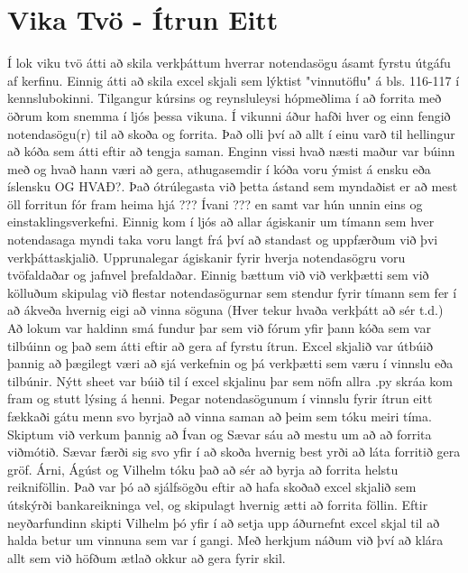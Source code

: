 \documentclass[a4paper, 12 pt]{article}
\begin{document}
\section{Vika Tvö - Ítrun Eitt}
Í lok viku tvö átti að skila verkþáttum hverrar notendasögu ásamt fyrstu útgáfu af kerfinu.  Einnig átti að skila excel skjali sem lýktist "vinnutöflu" á bls. 116-117 í kennslubokinni.  Tilgangur kúrsins og reynsluleysi hópmeðlima í að forrita með öðrum kom snemma í ljós þessa vikuna.  Í vikunni áður hafði hver og einn fengið notendasögu(r) til að skoða og forrita.  Það olli því að allt í einu varð til hellingur að kóða sem átti eftir að tengja saman.  Enginn vissi hvað næsti maður var búinn með og hvað hann væri að gera, athugasemdir í kóða voru ýmist á ensku eða íslensku OG HVAÐ?.  Það ótrúlegasta við þetta ástand sem myndaðist er að mest öll forritun fór fram heima hjá ??? Ívani ??? en samt var hún unnin eins og einstaklingsverkefni.  Einnig kom í ljós að allar ágiskanir um tímann sem hver notendasaga myndi taka voru langt frá því að standast og uppfærðum við þvi verkþáttaskjalið.  Upprunalegar ágiskanir fyrir hverja notendasögru voru tvöfaldaðar og jafnvel þrefaldaðar.  Einnig bættum við við verkþætti sem við kölluðum skipulag við flestar notendasögurnar sem stendur fyrir tímann sem fer í að ákveða hvernig eigi að vinna söguna (Hver tekur hvaða verkþátt að sér t.d.)  
Að lokum var haldinn smá fundur þar sem við fórum yfir þann kóða sem var tilbúinn og það sem átti eftir að gera af fyrstu ítrun.  Excel skjalið var útbúið þannig að þægilegt væri að sjá verkefnin og þá verkþætti sem væru í vinnslu eða tilbúnir.  Nýtt sheet var búið til í excel skjalinu þar sem nöfn allra .py skráa kom fram og stutt lýsing á henni.  Þegar notendasögunum í vinnslu fyrir ítrun eitt fækkaði gátu menn svo byrjað að vinna saman að þeim sem tóku meiri tíma.
Skiptum við verkum þannig að Ívan og Sævar sáu að mestu um að að forrita viðmótið.  Sævar færði sig svo yfir í að skoða hvernig best yrði að láta forritið gera gröf.  Árni, Ágúst og Vilhelm tóku það að sér að byrja að forrita helstu reikniföllin.  Það var þó að sjálfsögðu eftir að hafa skoðað excel skjalið sem útskýrði bankareikninga vel, og skipulagt hvernig ætti að forrita föllin.  Eftir neyðarfundinn skipti Vilhelm þó yfir í að setja upp áðurnefnt excel skjal til að halda betur um vinnuna sem var í gangi.  
Með herkjum náðum við því að klára allt sem við höfðum ætlað okkur að gera fyrir skil. 
\end{document}
